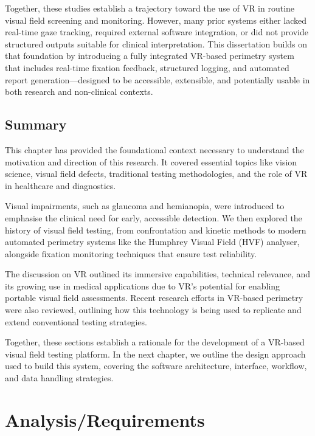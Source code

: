 \documentclass{l4proj}
\begin{document}
Together, these studies establish a trajectory toward the use of VR in routine visual field screening and monitoring. However, many prior systems either lacked real-time gaze tracking, required external software integration, or did not provide structured outputs suitable for clinical interpretation. This dissertation builds on that foundation by introducing a fully integrated VR-based perimetry system that includes real-time fixation feedback, structured logging, and automated report generation—designed to be accessible, extensible, and potentially usable in both research and non-clinical contexts.


\section{Summary}

This chapter has provided the foundational context necessary to understand the motivation and direction of this research. It covered essential topics like vision science, visual field defects, traditional testing methodologies, and the role of VR in healthcare and diagnostics.

Visual impairments, such as glaucoma and hemianopia, were introduced to emphasise the clinical need for early, accessible detection. We then explored the history of visual field testing, from confrontation and kinetic methods to modern automated perimetry systems like the Humphrey Visual Field (HVF) analyser, alongside fixation monitoring techniques that ensure test reliability.

The discussion on VR outlined its immersive capabilities, technical relevance, and its growing use in medical applications due to VR’s potential for enabling portable visual field assessments. Recent research efforts in VR-based perimetry were also reviewed, outlining how this technology is being used to replicate and extend conventional testing strategies.

Together, these sections establish a rationale for the development of a VR-based visual field testing platform. In the next chapter, we outline the design approach used to build this system, covering the software architecture, interface, workflow, and data handling strategies.



\chapter{Analysis/Requirements}
\end{document}
